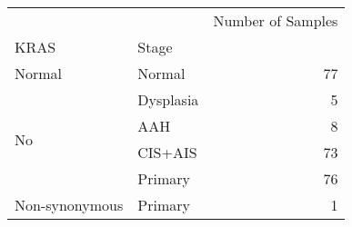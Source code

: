 \begin{tabular}{l|lr}
\toprule
               &         & Number of Samples \\
KRAS & Stage &                   \\
\midrule
Normal & Normal &                77 \\
\multirow{4}{*}{No} & Dysplasia &                 5 \\
               & AAH &                 8 \\
               & CIS+AIS &                73 \\
               & Primary &                76 \\
\cline{1-3}
Non-synonymous & Primary &                 1 \\
\bottomrule
\end{tabular}
